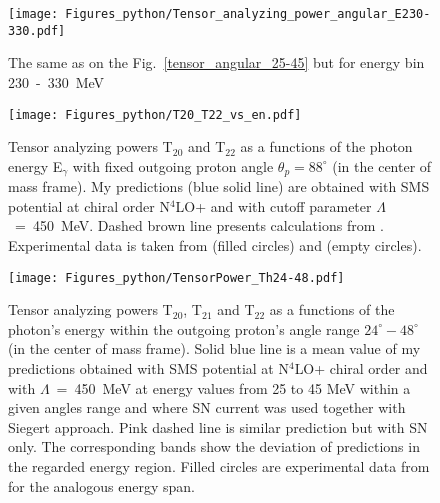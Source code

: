     \begin{figure}[h]
        \begin{center}
        \texttt{[image: Figures\_python/Tensor\_analyzing\_power\_angular\_E230-330.pdf]}
        \end{center}
        \caption{The same as on the Fig.~\ref*{tensor_angular_25-45} but for energy bin 230~-~330~MeV}
        \label{tensor_angular_230-330}
    \end{figure}
        


    \begin{figure}[h]
        \begin{center}
        \texttt{[image: Figures\_python/T20\_T22\_vs\_en.pdf]}
        \end{center}
        \caption{Tensor analyzing powers T$_{20}$ and T$_{22}$ as a functions of the photon energy E$_\gamma$
        with fixed outgoing proton angle $\theta_p = 88^{\circ}$ (in the center of mass frame).
        My predictions (blue solid line) are obtained with SMS potential at chiral order N$^4$LO+
        and with cutoff parameter $\Lambda$~=~450~MeV.
        Dashed brown line presents calculations from \cite{Schmitt1989}.
        Experimental data is taken from \cite{rachek2007} (filled circles)
        and \cite{mishev1993} (empty circles).}
        \label{T20_vs_en}
    \end{figure}

    \begin{figure}[h]
        \begin{center}
        \texttt{[image: Figures\_python/TensorPower\_Th24-48.pdf]}
        \end{center}
        \caption{Tensor analyzing powers T$_{20}$, T$_{21}$ and T$_{22}$ as a functions of the
        photon's energy within the outgoing proton's angle range $24^{\circ} - 48^{\circ}$
        (in the center of mass frame).
        Solid blue line is a mean value of my predictions obtained with
        SMS potential at N$^4$LO+ chiral order and with $\Lambda$~=~450~MeV
        at energy values from 25 to 45 MeV within
        a given angles range and
        where SN current was used together with Siegert approach. 
        Pink dashed line is similar prediction but with SN only. 
        The corresponding bands show the deviation of predictions in the regarded
        energy region.
        Filled circles are experimental data
        from \cite{rachek2007} for the analogous energy span.}
        \label{tensor_energy_24-48}
    \end{figure}

